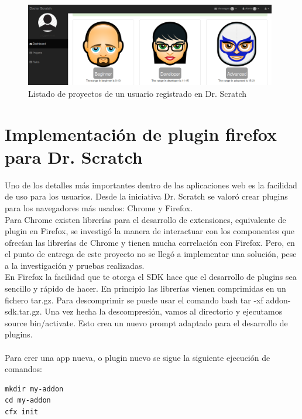 \documentclass[a4paper, 12pt]{book}
\begin{document}
\begin{figure}
	\graphicspath{{img/}}
  \includegraphics[bb=0 0 800 600, width=11cm, keepaspectratio]{niveles.png}
	\caption{Listado de proyectos de un usuario registrado en Dr. Scratch}
  \label{figura:foro_hilos}
\end{figure}


\section{Implementación de plugin firefox para Dr. Scratch}
\label{sec:servidor}

Uno de los detalles más importantes dentro de las aplicaciones web es la facilidad de 
uso para los usuarios. Desde la iniciativa Dr. Scratch se valoró crear plugins para
los navegadores más usados: Chrome y Firefox. \\

Para Chrome existen librerías para el desarrollo de extensiones, equivalente de plugin
en Firefox, se investigó la manera de interactuar con los componentes que ofrecían
las librerías de Chrome y tienen mucha correlación con Firefox. Pero, en el punto
de entrega de este proyecto no se llegó a implementar una solución, pese a la
investigación y pruebas realizadas. \\

En Firefox la facilidad que te otorga el SDK hace que el desarrollo de plugins sea 
sencillo y rápido de hacer. En principio las librerías vienen comprimidas en un
fichero tar.gz. Para descomprimir se puede usar el comando bash tar -xf addon-sdk.tar.gz.
Una vez hecha la descompresión, vamos al directorio y ejecutamos source bin/activate.
Esto crea un nuevo prompt adaptado para el desarrollo de plugins.\\ \\

Para crer una app nueva, o plugin nuevo se sigue la siguiente ejecución de comandos:
\begingroup
\fontsize{8pt}{9pt}\selectfont
\begin{verbatim}
mkdir my-addon
cd my-addon
cfx init
\end{verbatim}
\endgroup
\end{document}

